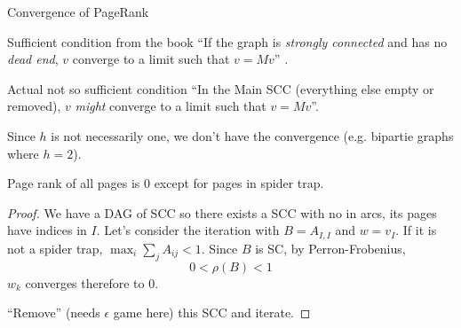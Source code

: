 \documentclass[10pt]{beamer}
\begin{document}
\begin{frame}[allowframebreaks]{Convergence of PageRank}
  \begin{block}{Sufficient condition from the book}
    ``If the graph is \emph{strongly connected} and has no \emph{dead end}, $v$ converge to a limit such that $v = Mv$''
    \cite[p.~185]{leskovec2014mining}.
  \end{block}
  \begin{block}{Actual not so sufficient condition}
    ``In the Main SCC (everything else empty or removed), $v$ \emph{might} converge to a limit such that $v = Mv$''.
  \end{block}
  Since $h$ is not necessarily one, we don't have the convergence (e.g. bipartie graphs where $h=2$).
  \framebreak

  Page rank of all pages is 0 except for pages in spider trap.
  \begin{proof}
    We have a DAG of SCC so there exists a SCC with no in arcs, its pages have indices in $I$.
    Let's consider the iteration with $B = A_{I,I}$ and $w=v_I$.
    If it is not a spider trap, $\max_i \sum_j A_{ij} < 1$.
    Since $B$ is SC, by Perron-Frobenius,
    \[ 0 < \rho(B) < 1 \]
    $w_k$ converges therefore to 0.

    ``Remove'' (needs $\epsilon$ game here) this SCC and iterate.
  \end{proof}
\end{frame}
\end{document}
